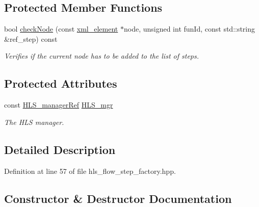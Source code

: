 \subsection*{Protected Member Functions}
\begin{DoxyCompactItemize}
\item 
bool \hyperlink{classHLSFlowStepFactory_a65dc11d6a2491bb44c1e10c38270cf91}{check\+Node} (const \hyperlink{classxml__element}{xml\+\_\+element} $\ast$node, unsigned int fun\+Id, const std\+::string \&ref\+\_\+step) const
\begin{DoxyCompactList}\small\item\em Verifies if the current node has to be added to the list of steps. \end{DoxyCompactList}\end{DoxyCompactItemize}
\subsection*{Protected Attributes}
\begin{DoxyCompactItemize}
\item 
const \hyperlink{hls__manager_8hpp_acd3842b8589fe52c08fc0b2fcc813bfe}{H\+L\+S\+\_\+manager\+Ref} \hyperlink{classHLSFlowStepFactory_aac24e2a560d49d1800fa8dddc37adb8a}{H\+L\+S\+\_\+mgr}
\begin{DoxyCompactList}\small\item\em The H\+LS manager. \end{DoxyCompactList}\end{DoxyCompactItemize}


\subsection{Detailed Description}


Definition at line 57 of file hls\+\_\+flow\+\_\+step\+\_\+factory.\+hpp.



\subsection{Constructor \& Destructor Documentation}
\mbox{\label{classHLSFlowStepFactory_a8af54ca36375ae5819956b489f0fa72b}} 
